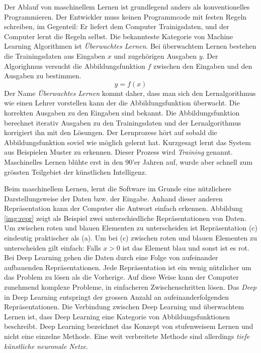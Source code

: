Der Ablauf von maschinellem Lernen ist grundlegend anders als konventionelles Programmieren. Der Entwickler muss keinen Programmcode mit festen Regeln schreiben, im Gegenteil: Er liefert dem Computer Trainigsdaten, und der Computer lernt die Regeln selbst. Die bekannteste Kategorie von Machine Learning Algorithmen ist \textit{Überwachtes Lernen}. Bei überwachtem Lernen bestehen die Trainingsdaten aus Eingaben $x$ und zugehörigen Ausgaben $y$. Der Algorighmus versucht die Abbildungsfunktion $f$ zwischen den Eingaben und den Ausgaben zu bestimmen. 
$$ y = f(x)$$
Der Name \textit{Überwachtes Lernen} kommt daher, dass man sich den Lernalgorithmus wie einen Lehrer vorstellen kann der die Abbildungsfunktion überwacht. Die korrekten Ausgaben zu den Eingaben sind bekannt. Die Abbildungsfunktion berechnet iterativ Ausgaben zu den Trainingsdaten und der Lernalgorithmus korrigiert ihn mit den Lösungen. Der Lernprozess hört auf sobald die Abbildungsfunktion soviel wie möglich gelernt hat. Kurzgesagt lernt das System aus Beispielen Muster zu erkennen. Dieser Prozess wird \textit{Training} genannt. Maschinelles Lernen blühte erst in den 90'er Jahren auf, wurde aber schnell zum grössten Teilgebiet der künstlichen Intelligenz. \parencite[vgl. ][Kap. 1.1.2]{chollet} \parencite[vgl. ][]{supervised}

Beim maschinellem Lernen, lernt die Software im Grunde eine nützlichere Darstellungsweise der Daten bzw. der Eingabe. Anhand dieser anderen Repräsentation kann der Computer die Antwort einfach erkennen. Abbildung \ref{img:repr} zeigt als Beispiel  zwei unterschiedliche Repräsentationen von Daten. Um zwischen roten und blauen Elementen zu unterscheiden ist Repräsentation (c) eindeutig praktischer als (a). Um bei (c) zwischen roten und blauen Elementen zu unterscheiden gilt einfach: Falls $x>0$ ist das Element blau und sonst ist es rot. Bei Deep Learning gehen die Daten durch eine Folge von aufeinander aufbauenden Repräsentationen. Jede Repräsentation ist ein wenig nützlicher um das Problem zu lösen als die Vorherige.  Auf diese Weise kann der Computer zunehmend komplexe Probleme, in einfacheren Zwischenschritten lösen. Das \textit{Deep} in Deep Learning entspringt der grossen Anzahl an aufeinanderfolgenden Repräsentationen. Die Verbindung zwischen Deep Learning und überwachtem Lernen ist, dass Deep Learning eine Kategorie von Abbildungsfunktionen beschreibt. Deep Learning bezeichnet das Konzept von stufenweisem Lernen und nicht eine einzelne Methode.  Eine weit verbreitete Methode sind allerdings \textit{tiefe künstliche neuronale Netze}. \parencite[vgl.][]{chollet} 

